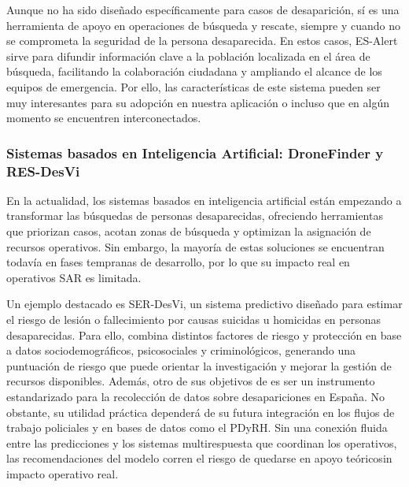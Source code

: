     Aunque no ha sido diseñado específicamente para casos de desaparición, sí es una herramienta de apoyo en operaciones de búsqueda y rescate, siempre y cuando no se comprometa la seguridad de la persona desaparecida. En estos casos, ES-Alert sirve para difundir información clave a la población localizada en el área de búsqueda, facilitando la colaboración ciudadana y ampliando el alcance de los equipos de emergencia\cite{ESAlertCastillaLeon2025}. Por ello, las características de este sistema pueden ser muy interesantes para su adopción en nuestra aplicación o incluso que en algún momento se encuentren interconectados.


    \subsubsection{Sistemas basados en Inteligencia Artificial: DroneFinder y RES-DesVi}
    
    En la actualidad, los sistemas basados en inteligencia artificial están empezando a transformar las búsquedas de personas desaparecidas, ofreciendo herramientas que priorizan casos, acotan zonas de búsqueda y optimizan la asignación de recursos operativos. Sin embargo, la mayoría de estas soluciones se encuentran todavía en fases tempranas de desarrollo, por lo que su impacto real en operativos SAR es limitada.
    
    Un ejemplo destacado es SER‑DesVi, un sistema predictivo diseñado para estimar el riesgo de lesión o fallecimiento por causas suicidas u homicidas en personas desaparecidas\cite{SERDesVi, SERDesVi_Validacion}. Para ello, combina distintos factores de riesgo y protección en base a datos sociodemográficos, psicosociales y criminológicos, generando una puntuación de riesgo que puede orientar la investigación y mejorar la gestión de recursos disponibles. Además, otro de sus objetivos de es ser un instrumento estandarizado para la recolección de datos sobre desapariciones en España. No obstante, su utilidad práctica dependerá de su futura integración en los flujos de trabajo policiales y en bases de datos como el PDyRH. Sin una conexión fluida entre las predicciones y los sistemas multirespuesta que coordinan los operativos, las recomendaciones del modelo corren el riesgo de quedarse en apoyo teóricosin impacto operativo real.

